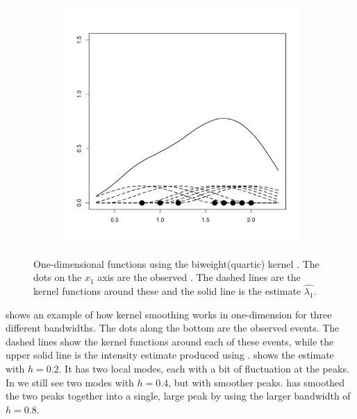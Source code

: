 \begin{figure}[H]
\begin{subfigure}[t]{0.32\textwidth}
        \label{fig:theory:kernel1d:04}
    \end{subfigure}
    \begin{subfigure}[t]{0.32\textwidth}
        \includegraphics[width=\textwidth]{img/kernel1d-08}
        \label{fig:theory:kernel1d:08}
    \end{subfigure}
    \caption{One-dimensional  functions using the biweight(quartic) kernel \citep{silverman1986density}.
        The dots on the $x_1$ axis are the observed .
        The dashed lines are the kernel functions around these 
        and the solid line is the  estimate $\hat{\lambda_1}$.}
    \label{fig:theory:kernel1d}
\end{figure}

 shows an example of how \gls{kernel} smoothing works in  one-dimension for three different bandwidths.
The dots along the bottom are the observed \glspl{event}.
The dashed lines show the \gls{kernel} functions around each of these \glspl{event},
while the upper solid line is the \gls{intensity} estimate produced using .
 shows the estimate with $h=0.2$.
It has two local modes, each with a bit of fluctuation at the peaks.
In  we still see two modes with $h=0.4$, but with smoother peaks.
 has smoothed the two peaks together into a single,
large peak by using the larger bandwidth of $h=0.8$.

